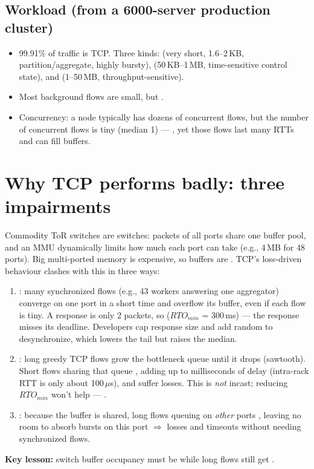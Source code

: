 \subsection{Workload (from a 6000-server production cluster)}
\begin{itemize}
\item 99.91\% of traffic is TCP. Three kinds:  (very short, 1.6--2\,KB, partition/aggregate, highly bursty),  (50\,KB--1\,MB, time-sensitive control state), and  (1--50\,MB, throughput-sensitive).
\item Most background flows are small, but .
\item Concurrency: a node typically has dozens of concurrent flows, but the number of concurrent  flows is tiny (median 1) --- , yet those flows last many RTTs and can fill buffers.
\end{itemize}

\section{Why TCP performs badly: three impairments}
Commodity ToR switches are  switches: packets of all ports share one buffer pool, and an MMU dynamically limits how much each port can take (e.g., 4\,MB for 48 ports). Big multi-ported memory is expensive, so buffers are . TCP's loss-driven behaviour clashes with this in three ways:
\begin{enumerate}
\item {}: many synchronized flows (e.g., 43 workers answering one aggregator) converge on one port in a short time and overflow its buffer, even if each flow is tiny. A response is only 2 packets, so  ($RTO_{min}$ = 300\,ms) --- the response misses its deadline. Developers cap response size and add random  to desynchronize, which lowers the tail but raises the median.
\item {}: long greedy TCP flows grow the bottleneck queue until it drops (sawtooth). Short flows sharing that queue , adding up to milliseconds of delay (intra-rack RTT is only about 100\,$\mu$s), and suffer losses. This is \emph{not} incast; reducing $RTO_{min}$ won't help --- .
\item {}: because the buffer is shared, long flows queuing on \emph{other} ports , leaving no room to absorb bursts on this port $\Rightarrow$ losses and timeouts without needing synchronized flows.
\end{enumerate}
\textbf{Key lesson:} switch buffer occupancy must be  while long flows still get .

